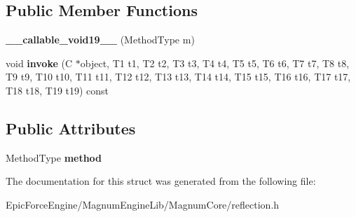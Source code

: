 \subsection*{Public Member Functions}
\begin{DoxyCompactItemize}
\item 
{\bfseries \+\_\+\+\_\+callable\+\_\+void19\+\_\+\+\_\+} (Method\+Type m)\hypertarget{structagm_1_1reflection_1_1____callable__void19_____ab8c7f59ae0b6ac7f37569f60afdae72c}{}\label{structagm_1_1reflection_1_1____callable__void19_____ab8c7f59ae0b6ac7f37569f60afdae72c}

\item 
void {\bfseries invoke} (C $\ast$object, T1 t1, T2 t2, T3 t3, T4 t4, T5 t5, T6 t6, T7 t7, T8 t8, T9 t9, T10 t10, T11 t11, T12 t12, T13 t13, T14 t14, T15 t15, T16 t16, T17 t17, T18 t18, T19 t19) const \hypertarget{structagm_1_1reflection_1_1____callable__void19_____a5318173ee3cb2bb2bdc98a4fd38c20b8}{}\label{structagm_1_1reflection_1_1____callable__void19_____a5318173ee3cb2bb2bdc98a4fd38c20b8}

\end{DoxyCompactItemize}
\subsection*{Public Attributes}
\begin{DoxyCompactItemize}
\item 
Method\+Type {\bfseries method}\hypertarget{structagm_1_1reflection_1_1____callable__void19_____a535ae67afd778709eea7c98ab0522ebe}{}\label{structagm_1_1reflection_1_1____callable__void19_____a535ae67afd778709eea7c98ab0522ebe}

\end{DoxyCompactItemize}


The documentation for this struct was generated from the following file\+:\begin{DoxyCompactItemize}
\item 
Epic\+Force\+Engine/\+Magnum\+Engine\+Lib/\+Magnum\+Core/reflection.\+h\end{DoxyCompactItemize}
